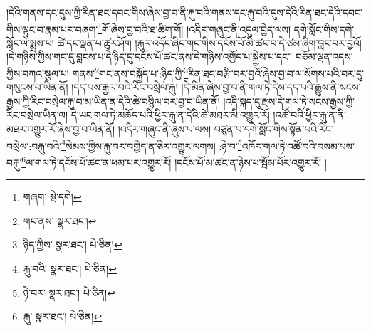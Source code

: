 །དེའི་གནས་དང་དུས་ཀྱི་རིན་ཐང་དབང་གིས་ཞེས་བྱ་བ་ནི་རྐུ་བའི་གནས་དང་རྐུ་བའི་དུས་དེའི་རིན་ཐང་དེའི་དབང་གིས་ལྟུང་བ་རྣམ་པར་བཞག་\footnote{གཞག་  སྡེ་དགེ། }གོ་ཞེས་བྱ་བའི་ཐ་ཚིག་གོ། །འདིར་གཞུང་ནི་འདུལ་བྱེད་ལས། དགེ་སློང་གིས་དགེ་སློང་ལ་སྨྲས་པ། ཚེ་དང་ལྡན་པ་ཚུར་ཤོག །རྐུར་འདོང་ཞིང་གང་གིས་དངོས་པོ་མི་ཚང་བ་དེ་ཙམ་ཞིག་བླང་བར་བྱའོ། །དེ་གཉིས་ཀྱིས་གང་དུ་བླངས་པ་དེ་ཉིད་དུ་དངོས་པོ་ཚང་ནས་དེ་གཉིས་འགྱོད་པ་སྐྱེས་པ་དང་། བཅོམ་ལྡན་འདས་ཀྱིས་བཀའ་སྩལ་པ། གནས་\footnote{གང་ནས་  སྣར་ཐང་། }གང་ནས་བསྐྱོད་པ་:ཉིད་ཀྱི་\footnote{ཉིད་ཀྱིས་  སྣར་ཐང་།  པེ་ཅིན། }རིན་ཐང་བརྩི་བར་བྱའོ་ཞེས་བྱ་བ་ལ་སོགས་པའི་བར་དུ་གསུངས་པ་ཡིན་ནོ། །དད་པས་རྒྱལ་བའི་རིང་བསྲེལ་རྐུ། །དེ་མིན་ཞེས་བྱ་བ་ནི་གལ་ཏེ་དེས་དད་པའི་རྒྱུས་ནི་སངས་རྒྱས་ཀྱི་རིང་བསྲེལ་རྐུ་བ་མ་ཡིན་ན་དེའི་ཚེ་བསྙིལ་བར་བྱ་བ་ཡིན་ནོ། །འདི་སྐད་དུ་རྫས་དེ་གལ་ཏེ་སངས་རྒྱས་ཀྱི་རིང་བསྲེལ་ཡིན་ལ། དེ་ཡང་གལ་ཏེ་མཆོད་པའི་ཕྱིར་རྐུ་ན་དེའི་ཚེ་མཐར་མི་འགྱུར་རོ། །འཚོ་བའི་ཕྱིར་རྐུ་ན་ནི་མཐར་འགྱུར་རོ་ཞེས་བྱ་བ་ཡིན་ནོ། །འདིར་གཞུང་ནི་ཞུས་པ་ལས། བཙུན་པ་དགེ་སློང་གིས་སྟོན་པའི་རིང་བསྲེལ་:བརྐུ་བའི་\footnote{རྐུ་བའི་  སྣར་ཐང་།  པེ་ཅིན། }སེམས་ཀྱིས་རྐུ་བར་བགྱིད་ན་ཅིར་འགྱུར་ལགས། :ཉེ་བ་\footnote{ཉེ་བར་  སྣར་ཐང་།  པེ་ཅིན། }འཁོར་གལ་ཏེ་འཚོ་བའི་བསམ་པས་བརྐུ་\footnote{རྐུ་  སྣར་ཐང་།  པེ་ཅིན། }ལ་གལ་ཏེ་དངོས་པོ་ཚང་ན་ཕམ་པར་འགྱུར་རོ། །དངོས་པོ་མ་ཚང་ན་ཉེས་པ་སྦོམ་པོར་འགྱུར་རོ། །
